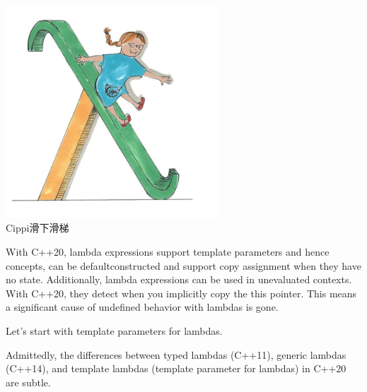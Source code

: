 \begin{center}
\includegraphics[width=0.6\textwidth]{content/3/chapter4/images/41.png}\\
Cippi滑下滑梯
\end{center}

With C++20, lambda expressions support template parameters and hence concepts, can be defaultconstructed and support copy assignment when they have no state. Additionally, lambda expressions can be used in unevaluated contexts. With C++20, they detect when you implicitly copy the this pointer. This means a significant cause of undefined behavior with lambdas is gone.

Let’s start with template parameters for lambdas.



Admittedly, the differences between typed lambdas (C++11), generic lambdas (C++14), and template lambdas (template parameter for lambdas) in C++20 are subtle.

